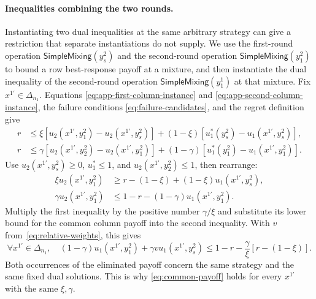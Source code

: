 \documentclass[11pt]{article}
\theoremstyle{remark}
\theoremstyle{plain}
\newcommand{\sm}{\mathsf{SimpleMixing}}
\begin{document}
\paragraph{Inequalities combining the two rounds.}
Instantiating two dual inequalities at the same arbitrary strategy
can give a restriction that separate instantiations do not supply.
We use the first-round operation $\sm(y_s^2)$ and the second-round
operation $\sm(y_1^2)$ to bound a row best-response payoff at a
mixture, and then instantiate the dual inequality of the second-round
operation $\sm(y_1^1)$ at that mixture.
Fix $x^{1\prime}\in\Delta_{n_1}$. Equations
\eqref{eq:app-first-column-instance} and
\eqref{eq:app-second-column-instance}, the failure conditions
\eqref{eq:failure-candidates}, and the regret definition give
\begin{equation}
 \begin{aligned}
 r&\le\xi[u_2(x^{1\prime},y_1^2)-u_2(x^{1\prime},y_s^2)]
             +(1-\xi)[u_1^*(y_s^2)-u_1(x^{1\prime},y_s^2)],\\
 r&\le\gamma[u_2(x^{1\prime},y_2^2)-u_2(x^{1\prime},y_1^2)]
             +(1-\gamma)[u_1^*(y_1^2)-u_1(x^{1\prime},y_1^2)].
 \end{aligned}
 \label{eq:app-shared-column-tests}
\end{equation}
Use $u_2(x^{1\prime},y_s^2)\ge0$, $u_1^*\le1$, and
$u_2(x^{1\prime},y_2^2)\le1$, then rearrange:
\begin{equation}
 \begin{aligned}
 \xi u_2(x^{1\prime},y_1^2)
     &\ge r-(1-\xi)+(1-\xi)u_1(x^{1\prime},y_s^2),\\
 \gamma u_2(x^{1\prime},y_1^2)
     &\le1-r-(1-\gamma)u_1(x^{1\prime},y_1^2).
 \end{aligned}
 \label{eq:app-shared-column-payoff-inequalities}
\end{equation}
Multiply the first inequality by the positive number $\gamma/\xi$
and substitute its lower bound for the common column payoff into
the second inequality. With $v$ from~\eqref{eq:relative-weights},
this gives
\begin{equation}
 \forall x^{1\prime}\in\Delta_{n_1},\quad
 (1-\gamma)u_1(x^{1\prime},y_1^2)+\gamma v u_1(x^{1\prime},y_s^2)
 \le1-r-\frac{\gamma}{\xi}[r-(1-\xi)].
 \label{eq:common-payoff}
\end{equation}
Both occurrences of the eliminated payoff concern the same
strategy and the same fixed dual solutions. This is why
\eqref{eq:common-payoff} holds for every $x^{1\prime}$ with the same
$\xi,\gamma$.
\end{document}
